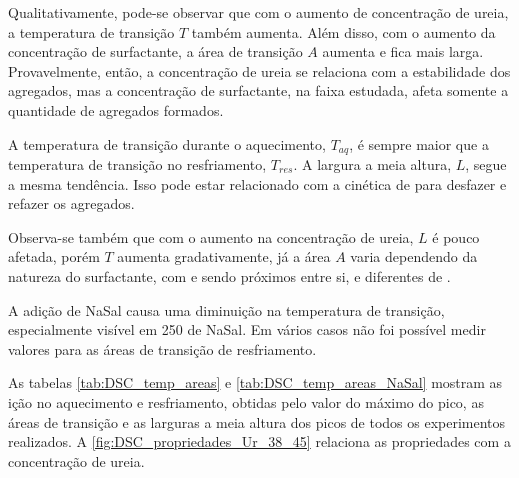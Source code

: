 	Qualitativamente, pode-se observar que com o aumento de concentração de ureia, a temperatura de transição \(T\) também aumenta. Além disso, com o aumento da concentração de surfactante, a área de transição \(A\) aumenta e fica mais larga. Provavelmente, então, a concentração de ureia se relaciona com a estabilidade dos agregados, mas a concentração de surfactante, na faixa estudada, afeta somente a quantidade de agregados formados. 
	
	A temperatura de transição durante o aquecimento, \(T_{aq}\), é sempre maior que a temperatura de transição no resfriamento, \(T_{res}\). A largura a meia altura, \(L\), segue a mesma tendência. Isso pode estar relacionado com a cinética de para desfazer e refazer os agregados. 
	
	Observa-se também que com o aumento na concentração de ureia, \(L\) é pouco afetada, porém \(T\) aumenta gradativamente, já a área \(A\) varia dependendo da natureza do surfactante, com \CTAB{} e \TTAB{} sendo próximos entre si, e diferentes de \DTAB.
	
	A adição de NaSal causa uma diminuição na temperatura de transição, especialmente visível em 250\mM{} de NaSal. Em vários casos não foi possível medir valores para as áreas de transição de resfriamento.
	
	As tabelas \ref{tab:DSC_temp_areas} e \ref{tab:DSC_temp_areas_NaSal} mostram as ição no aquecimento e resfriamento, obtidas pelo valor do máximo do pico, as áreas de transição e as larguras a meia altura dos picos de todos os experimentos realizados. A \autoref{fig:DSC_propriedades_Ur_38_45} relaciona as propriedades com a concentração de ureia. %
	
